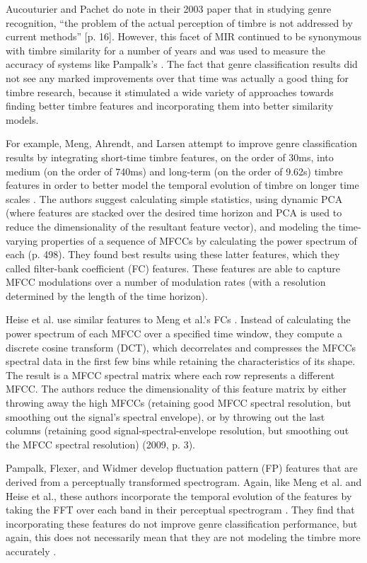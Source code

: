 \documentclass[a4paper,12pt]{report} 	%
\numberwithin{figure}{chapter}
\numberwithin{table}{chapter}
\numberwithin{equation}{chapter}
\begin{document}
\begin{flushleft}
Aucouturier and Pachet do note in their 2003 paper that in studying genre recognition, ``the problem of the actual perception of timbre is not addressed by current methods'' \cite{Aucouturier:2003gs}[p. 16]. However, this facet of MIR continued to be synonymous with timbre similarity for a number of years and was used to measure the accuracy of systems like Pampalk's \cite{Pampalk:2006pr}. The fact that genre classification results did not see any marked improvements over that time was actually a good thing for timbre research, because it stimulated a wide variety of approaches towards finding better timbre features and incorporating them into better similarity models.

For example, Meng, Ahrendt, and Larsen attempt to improve genre classification results by integrating short-time timbre features, on the order of 30ms, into medium (on the order of 740ms) and long-term (on the order of 9.62s) timbre features in order to better model the temporal evolution of timbre on longer time scales \cite[p. 498]{Meng:2005fx}. The authors suggest calculating simple statistics, using dynamic PCA (where features are stacked over the desired time horizon and PCA is used to reduce the dimensionality of the resultant feature vector), and modeling the time-varying properties of a sequence of MFCCs by calculating the power spectrum of each (p. 498). They found best results using these latter features, which they called filter-bank coefficient (FC) features. These features are able to capture MFCC modulations over a number of modulation rates (with a resolution determined by the length of the time horizon). 

Heise et al. use similar features to Meng et al.'s FCs \cite{Heise:2009sp}. Instead of calculating the power spectrum of each MFCC over a specified time window, they compute a discrete cosine transform (DCT), which decorrelates and compresses the MFCCs spectral data in the first few bins while retaining the characteristics of its shape. The result is a MFCC spectral matrix where each row represents a different MFCC. The authors reduce the dimensionality of this feature matrix by either throwing away the high MFCCs (retaining good MFCC spectral resolution, but smoothing out the signal's spectral envelope), or by throwing out the last columns (retaining good signal-spectral-envelope resolution, but smoothing out the MFCC spectral resolution) (2009, p. 3).

Pampalk, Flexer, and Widmer develop fluctuation pattern (FP) features that are derived from a perceptually transformed spectrogram. Again, like Meng et al. and Heise et al., these authors incorporate the temporal evolution of the features by taking the FFT over each band in their perceptual spectrogram \cite[p. 4]{Pampalk:2005ix}. They find that incorporating these features do not improve genre classification performance, but again, this does not necessarily mean that they are not modeling the timbre more accurately \cite[p. 8]{Pampalk:2005ix}.


\end{flushleft}
\end{document}
